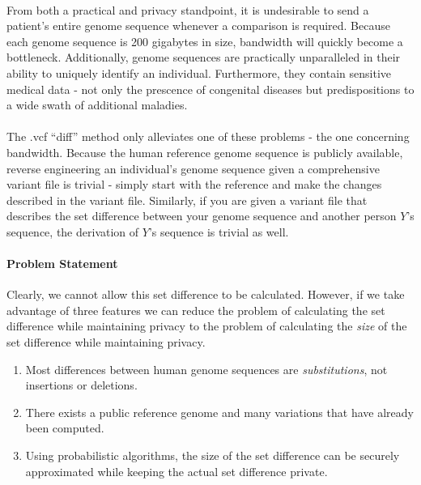 \paragraph{}
From both a practical and privacy standpoint, it is undesirable to send a patient's entire genome sequence whenever a comparison is required. Because each genome sequence is 200 gigabytes in size, bandwidth will quickly become a bottleneck. Additionally, genome sequences are practically unparalleled in their ability to uniquely identify an individual. Furthermore, they contain sensitive medical data - not only the prescence of congenital diseases but predispositions to a wide swath of additional maladies.

\paragraph{}
The .vcf ``diff'' method only alleviates one of these problems - the one concerning bandwidth. Because the human reference genome sequence is publicly available, reverse engineering an individual's genome sequence given a comprehensive variant file is trivial - simply start with the reference and make the changes described in the variant file. Similarly, if you are given a variant file that describes the set difference between your genome sequence and another person $Y$'s sequence, the derivation of $Y$'s sequence is trivial as well. 

\paragraph{Problem Statement}
Clearly, we cannot allow this set difference to be calculated. However, if we take advantage of three features we can reduce the problem of calculating the set difference while maintaining privacy to the problem of calculating the \textit{size} of the set difference while maintaining privacy.

\begin{enumerate}
\item Most differences between human genome sequences are \textit{substitutions}, not insertions or deletions.
\item There exists a public reference genome and many variations that have already been computed.
\item Using probabilistic algorithms, the size of the set difference can be securely approximated while keeping the actual set difference private.
\end{enumerate}


